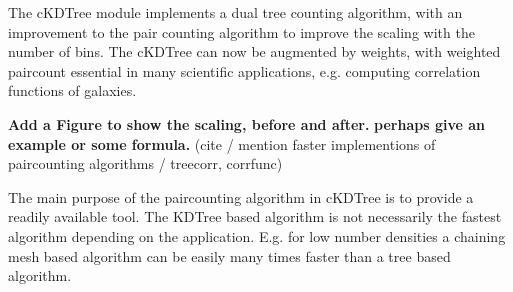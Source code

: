 The cKDTree module implements a dual tree counting algorithm\cite{Moore2000ar},
with an improvement to the pair counting algorithm to improve the scaling
with the number of bins. The cKDTree can now be augmented by weights, with 
weighted paircount essential in many scientific applications, e.g. computing 
correlation functions of galaxies\cite{0004-637X-750-1-38}.

\textbf{Add a Figure to show the scaling, before and after.}
\textbf{perhaps give an example or some formula.}
(cite / mention faster implementions of paircounting algorithms / treecorr, corrfunc)

The main purpose of the paircounting algorithm in cKDTree is to provide a readily
available tool. The KDTree based algorithm is not necessarily the fastest algorithm
depending on the application. E.g. for low number densities a chaining mesh based algorithm
can be easily many times faster than a tree based algorithm\cite{1991ApJ}.

